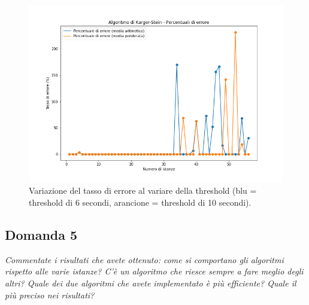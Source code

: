 \begin{figure}[H]
	\centering
	\includegraphics[width=1\textwidth]{res/images/single/karger-stein/tasso-di-errore/karger_stein_tassi_di_errore.png}
	\caption{Variazione del tasso di errore al variare della threshold
	(blu = threshold di 6 secondi, arancione = threshold di 10 secondi).}
	\label{fig:karger_stein_tassi_di_errore}
\end{figure}

\subsection{Domanda 5}
\textit{Commentate i risultati che avete ottenuto: come si comportano gli algoritmi rispetto alle varie istanze? C'è un algoritmo che riesce sempre a fare meglio degli altri? Quale dei due algoritmi che avete implementato è più efficiente? Quale il più preciso nei risultati?}

